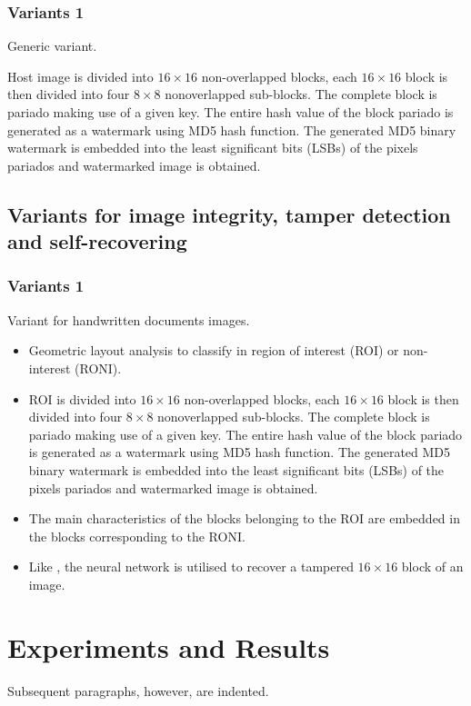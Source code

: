 \documentclass[runningheads]{llncs}
\begin{document}
\subsubsection{Variants 1}
Generic variant.

Host image is divided into $16\times 16$ non-overlapped blocks, each $16\times 16$ block is then divided into four $8\times 8$ nonoverlapped sub-blocks. The complete block is pariado making use of a given key. The entire hash value of the block pariado is generated as a watermark using MD5 hash function. The generated MD5 binary watermark is embedded into the least significant bits (LSBs) of the pixels pariados and watermarked image is obtained.

\subsection{Variants for image integrity, tamper detection and self-recovering}
\subsubsection{Variants 1}
Variant for handwritten documents images.

\begin{itemize}
	\item Geometric layout analysis to classify in region of interest (ROI) or non-interest (RONI). 
	\item ROI is divided into $16\times 16$ non-overlapped blocks, each $16\times 16$ block is then divided into four $8\times 8$ nonoverlapped sub-blocks. The complete block is pariado making use of a given key. The entire hash value of the block pariado is generated as a watermark using MD5 hash function. The generated MD5 binary watermark is embedded into the least significant bits (LSBs) of the pixels pariados and watermarked image is obtained.
	\item The main characteristics of the blocks belonging to the ROI are embedded in the blocks corresponding to the RONI.
	\item Like \cite{el2014image}, the neural network is utilised to recover a tampered $16\times 16$ block of an image.  
\end{itemize}



\section{Experiments and Results}
Subsequent paragraphs, however, are indented.
\end{document}
